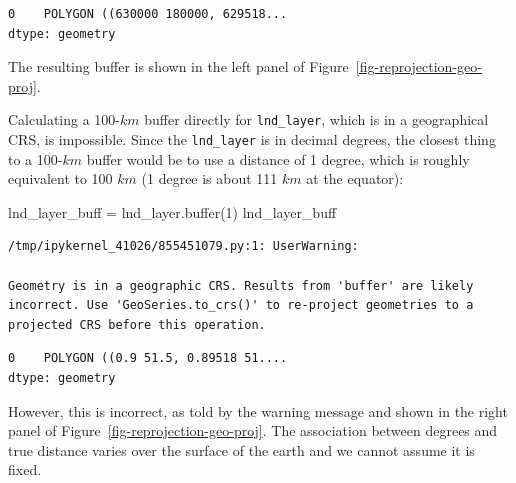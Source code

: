 \documentclass[
  letterpaper,
]{krantz}
\newenvironment{Shaded}{\begin{snugshade}}{\end{snugshade}}
\newcommand{\BuiltInTok}[1]{\textcolor[rgb]{0.00,0.23,0.31}{#1}}
\newcommand{\DecValTok}[1]{\textcolor[rgb]{0.68,0.00,0.00}{#1}}
\newcommand{\NormalTok}[1]{\textcolor[rgb]{0.00,0.23,0.31}{#1}}
\newcommand{\OperatorTok}[1]{\textcolor[rgb]{0.37,0.37,0.37}{#1}}
\begin{document}
\begin{verbatim}
0    POLYGON ((630000 180000, 629518...
dtype: geometry
\end{verbatim}

The resulting buffer is shown in the left panel of
Figure~\ref{fig-reprojection-geo-proj}.

Calculating a 100-\(km\) buffer directly for \texttt{lnd\_layer}, which
is in a geographical CRS, is impossible. Since the \texttt{lnd\_layer}
is in decimal degrees, the closest thing to a 100-\(km\) buffer would be
to use a distance of 1 degree, which is roughly equivalent to 100 \(km\)
(1 degree is about 111 \(km\) at the equator):

\begin{Shaded}
\begin{Highlighting}[]
\NormalTok{lnd\_layer\_buff }\OperatorTok{=}\NormalTok{ lnd\_layer.}\BuiltInTok{buffer}\NormalTok{(}\DecValTok{1}\NormalTok{)}
\NormalTok{lnd\_layer\_buff}
\end{Highlighting}
\end{Shaded}

\begin{verbatim}
/tmp/ipykernel_41026/855451079.py:1: UserWarning:

Geometry is in a geographic CRS. Results from 'buffer' are likely incorrect. Use 'GeoSeries.to_crs()' to re-project geometries to a projected CRS before this operation.

\end{verbatim}

\begin{verbatim}
0    POLYGON ((0.9 51.5, 0.89518 51....
dtype: geometry
\end{verbatim}

However, this is incorrect, as told by the warning message and shown in
the right panel of Figure~\ref{fig-reprojection-geo-proj}. The
association between degrees and true distance varies over the surface of
the earth and we cannot assume it is fixed.
\end{document}
